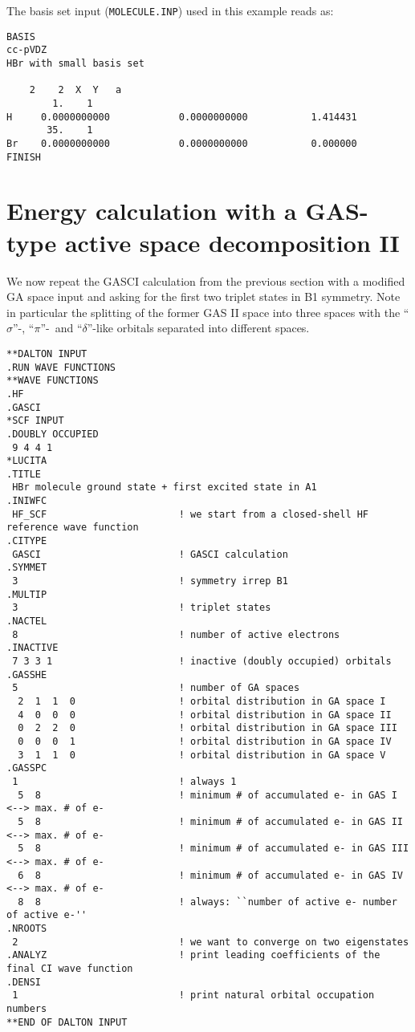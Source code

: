 The basis set input (\verb|MOLECULE.INP|) used in this example reads as:

\begin{verbatim}
BASIS
cc-pVDZ
HBr with small basis set

    2    2  X  Y   a
        1.    1
H     0.0000000000            0.0000000000           1.414431
       35.    1
Br    0.0000000000            0.0000000000           0.000000
FINISH
\end{verbatim}

\section{Energy calculation with a GAS-type active space decomposition II}

We now repeat the GASCI calculation from the previous section 
with a modified GA space input and asking for the first two triplet states in B1 symmetry. 
Note in particular the splitting of the former GAS II space into three 
spaces with the ``$\sigma$''-, ``$\pi$''-\ and ``$\delta$''-like orbitals separated into different spaces. 

%
\begin{verbatim}
**DALTON INPUT
.RUN WAVE FUNCTIONS
**WAVE FUNCTIONS
.HF
.GASCI
*SCF INPUT
.DOUBLY OCCUPIED
 9 4 4 1
*LUCITA
.TITLE
 HBr molecule ground state + first excited state in A1
.INIWFC
 HF_SCF                       ! we start from a closed-shell HF reference wave function
.CITYPE
 GASCI                        ! GASCI calculation
.SYMMET
 3                            ! symmetry irrep B1
.MULTIP
 3                            ! triplet states
.NACTEL
 8                            ! number of active electrons
.INACTIVE
 7 3 3 1                      ! inactive (doubly occupied) orbitals
.GASSHE
 5                            ! number of GA spaces
  2  1  1  0                  ! orbital distribution in GA space I
  4  0  0  0                  ! orbital distribution in GA space II
  0  2  2  0                  ! orbital distribution in GA space III
  0  0  0  1                  ! orbital distribution in GA space IV
  3  1  1  0                  ! orbital distribution in GA space V
.GASSPC
 1                            ! always 1
  5  8                        ! minimum # of accumulated e- in GAS I    <--> max. # of e-
  5  8                        ! minimum # of accumulated e- in GAS II   <--> max. # of e-
  5  8                        ! minimum # of accumulated e- in GAS III  <--> max. # of e-
  6  8                        ! minimum # of accumulated e- in GAS IV   <--> max. # of e-
  8  8                        ! always: ``number of active e- number of active e-''
.NROOTS
 2                            ! we want to converge on two eigenstates
.ANALYZ                       ! print leading coefficients of the final CI wave function
.DENSI
 1                            ! print natural orbital occupation numbers
**END OF DALTON INPUT
\end{verbatim}
